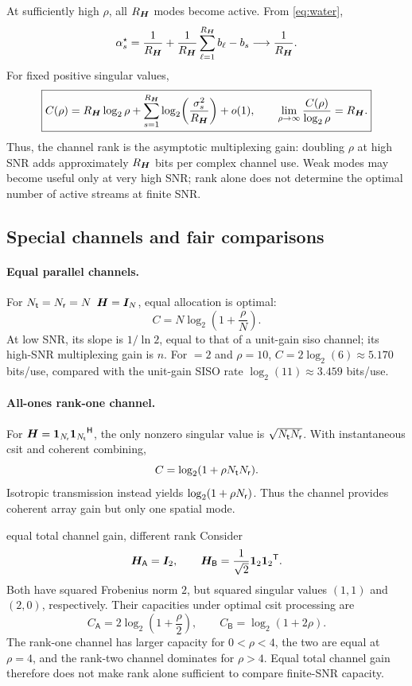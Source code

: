 At sufficiently high $\rho$, all $R_{\bm{H}}$ modes become active. From \eqref{eq:water},
\[
\alpha_s^\star=\frac1{R_{\bm{H}}}
+\frac1{R_{\bm{H}}}\sum_{\ell=1}^{R_{\bm{H}}}b_\ell-b_s
\longrightarrow\frac1{R_{\bm{H}}}.
\]
For fixed positive singular values,
\begin{equation}\label{eq:highsnr}
	\boxed{
		C(\rho)=R_{\bm{H}}\log_2\rho
		+\sum_{s=1}^{R_{\bm{H}}}\log_2\!\left(\frac{\sigma_s^2}{R_{\bm{H}}}\right)
		+o(1),\qquad
		\lim_{\rho\to\infty}\frac{C(\rho)}{\log_2\rho}=R_{\bm{H}}.}
\end{equation}
Thus, the channel rank is the asymptotic multiplexing gain: doubling $\rho$ at high SNR adds approximately $R_{\bm{H}}$ bits per complex channel use. Weak modes may become useful only at very high SNR; rank alone does not determine the optimal number of active streams at finite SNR.

\subsection{Special channels and fair comparisons}\label{sec:specialchannels}

\paragraph{Equal parallel channels.}
For $N_{\mathsf{t}} = N_{\mathsf{r}} = N$ $\bm{H}=\bm{I}_N$, equal allocation is optimal:
\[
C=N\log_2\!\left(1+\frac\rho N\right).
\]
At low SNR, its slope is $1/\ln2$, equal to that of a unit-gain \ac{siso} channel; its high-SNR multiplexing gain is $n$. For $=2$ and $\rho=10$, $C=2\log_2(6)\approx5.170$ bits/use, compared with the unit-gain SISO rate $\log_2(11)\approx3.459$ bits/use.

\paragraph{All-ones rank-one channel.}
For $\bm{H}=\bm{1}_{N_{\mathsf{r}}}{\bm{1}_{N_{\mathsf{t}}}}^{\mathsf{H}}$, the only nonzero singular value is $\sqrt{N_{\mathsf{t}}N_{\mathsf{r}}}$. With instantaneous \ac{csit} and coherent combining,
\[
C=\log_2(1+\rho N_{\mathsf{t}}N_{\mathsf{r}}).
\]
Isotropic transmission instead yields $\log_2(1+\rho N_{\mathsf{r}})$. Thus the channel provides coherent array gain but only one spatial mode.

\begin{example}{equal total channel gain, different rank}
	Consider
	\[
	\bm{H}_{\mathsf A}=\bm{I}_2,
	\qquad
	\bm{H}_{\mathsf B}=\frac1{\sqrt2}\bm{1}_2{\bm{1}_2}^{\mathsf{T}}.
	\]
	Both have squared Frobenius norm $2$, but squared singular values $(1,1)$ and $(2,0)$, respectively. Their capacities under optimal \ac{csit} processing are
	\[
	C_{\mathsf A}=2\log_2\!\left(1+\frac\rho2\right),
	\qquad
	C_{\mathsf B}=\log_2(1+2\rho).
	\]
	The rank-one channel has larger capacity for $0<\rho<4$, the two are equal at $\rho=4$, and the rank-two channel dominates for $\rho>4$. Equal total channel gain therefore does not make rank alone sufficient to compare finite-SNR capacity.
\end{example}


